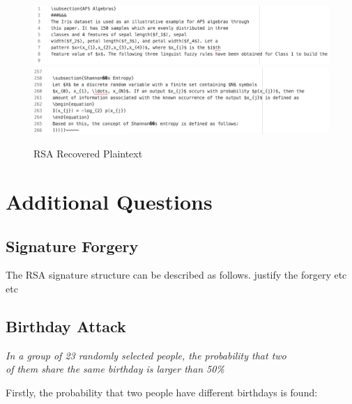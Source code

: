 \documentclass[]{article}
\begin{document}
\begin{figure}[H]
	\includegraphics[height=\textheight/6,width=\textwidth]{rsa_plain1.png}
	\includegraphics[height=\textheight/6,width=\textwidth]{rsa_plain2.png}	
	\caption{RSA Recovered Plaintext}
	\centering
\end{figure}

\pagebreak


\vspace*{-0.8cm}
\section*{\hfil Additional Questions\hfil}

\subsection*{Signature Forgery}

The RSA signature structure can be described as follows. justify the forgery etc etc

\subsection*{Birthday Attack}

\vspace{0.5cm}
\begin{center}
\textit{In a group of 23 randomly selected people, the probability that two\\ of them share the same birthday is larger than 50\%}
\end{center}
\vspace{0.5cm}

\noindent
Firstly, the probability that two people have different birthdays is found:
\end{document}

